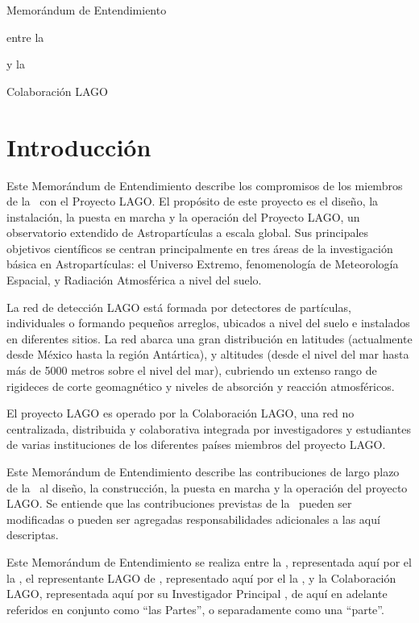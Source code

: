 {\bf
  {\LARGE
    \centerline{Memorándum de Entendimiento}
  }
  {\Large
    \centerline{entre la}
    \centerline{\institution}
    \centerline{y la}
    \centerline{Colaboración LAGO}
    \vspace*{0.2cm}
    \centerline{\datesignes}
  }
}

\section{Introducción}

Este Memorándum de Entendimiento describe los compromisos de los miembros de
la \institution~con el Proyecto LAGO. El propósito de este proyecto es el
diseño, la instalación, la puesta en marcha y la operación del Proyecto LAGO,
un observatorio extendido de Astropartículas a escala global. Sus principales
objetivos científicos se centran principalmente en tres áreas de la
investigación básica en Astropartículas: el Universo Extremo, fenomenología de
Meteorología Espacial, y Radiación Atmosférica a nivel del suelo. 

La red de detección LAGO está formada por detectores de partículas,
individuales o formando pequeños arreglos, ubicados a nivel del suelo e
instalados en diferentes sitios. La red abarca una gran distribución en latitudes
(actualmente desde México hasta la región Antártica), y altitudes (desde el
nivel del mar hasta más de 5000 metros sobre el nivel del mar), cubriendo un
extenso rango de rigideces de corte geomagnético y niveles de absorción y
reacción atmosféricos.

El proyecto LAGO es operado por la Colaboración LAGO, una red no centralizada,
distribuida y colaborativa integrada por investigadores y estudiantes de varias
instituciones de los diferentes países miembros del proyecto LAGO.

Este Memorándum de Entendimiento describe las contribuciones de largo plazo de
la \institution~al diseño, la construcción, la puesta en marcha y la operación
del proyecto LAGO. Se entiende que las contribuciones previstas de la
\institution~pueden ser modificadas o pueden ser agregadas responsabilidades
adicionales a las aquí descriptas.

Este Memorándum de Entendimiento se realiza entre la \institution, representada
aquí por \ifirg el \else la \fi \instrep, el representante LAGO de \country,
representado aquí por \ifcrg el \else la \fi \countryrep, y la Colaboración
LAGO, representada aquí por su Investigador Principal \lagopi, de aquí en
adelante referidos en conjunto como ``las Partes'', o separadamente como una
``parte''.

